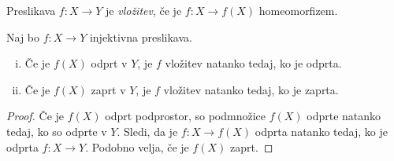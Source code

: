 \begin{definicija}
Preslikava $f \colon X \to Y$ je
\emph{vložitev}, če je
$f \colon X \to f(X)$ homeomorfizem.
\end{definicija}

\begin{trditev}
Naj bo $f \colon X \to Y$ injektivna preslikava.

\begin{enumerate}[i)]
\item Če je $f(X)$ odprt v $Y$, je $f$ vložitev natanko tedaj, ko
je odprta.
\item Če je $f(X)$ zaprt v $Y$, je $f$ vložitev natanko tedaj, ko
je zaprta.
\end{enumerate}
\end{trditev}

\begin{proof}
Če je $f(X)$ odprt podprostor, so podmnožice $f(X)$ odprte natanko
tedaj, ko so odprte v $Y$. Sledi, da je $f \colon X \to f(X)$
odprta natanko tedaj, ko je odprta $f \colon X \to Y$. Podobno
velja, če je $f(X)$ zaprt.
\end{proof}
